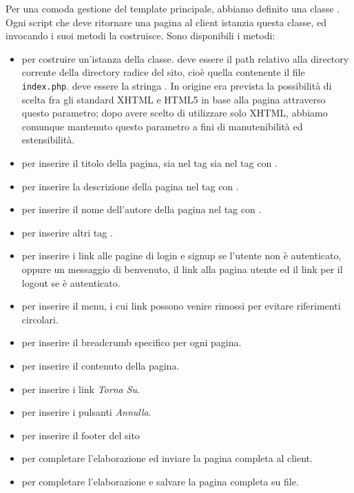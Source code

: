 Per una comoda gestione del template principale, abbiamo definito una classe .
Ogni script che deve ritornare una pagina al client istanzia questa classe, ed invocando i suoi metodi la costruisce.
Sono disponibili i metodi:
\begin{itemize}
	\item {} per costruire un'istanza della classe.  deve essere il path relativo alla directory corrente della directory radice del sito, cioè quella contenente il file \texttt{index.php}.  deve essere la stringa . In origine era prevista la possibilità di scelta fra gli standard XHTML e HTML5 in base alla pagina attraverso questo parametro; dopo avere scelto di utilizzare solo XHTML, abbiamo comunque mantenuto questo parametro a fini di  manutenibilità ed estensibilità.
	\item {} per inserire il titolo della pagina, sia nel tag  sia nel tag  con .
	\item {} per inserire la descrizione della pagina nel tag  con .
	\item {} per inserire il nome dell'autore della pagina nel tag  con .
	\item {} per inserire altri tag .
	\item {} per inserire i link alle pagine di login e signup se l'utente non è autenticato, oppure un messaggio di benvenuto, il link alla pagina utente ed il link per il logout se è autenticato.
	\item {} per inserire il menu, i cui link possono venire rimossi per evitare riferimenti circolari.
	\item {} per inserire il breadcrumb specifico per ogni pagina.
	\item {} per inserire il contenuto della pagina.
	\item {} per inserire i link \textit{Torna Su}.
	\item {} per inserire i pulsanti \textit{Annulla}.
	\item {} per inserire il footer del sito
	\item {} per completare l'elaborazione ed inviare la pagina completa al client.
	\item {} per completare l'elaborazione e salvare la pagina completa su file.
\end{itemize}
